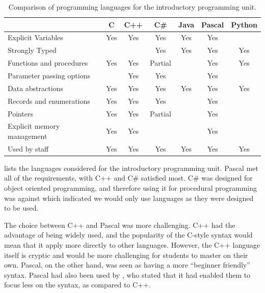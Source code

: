 \begin{table}
	\renewcommand{\arraystretch}{1.6}
	\centering
	\caption{Comparison of programming languages for the introductory programming unit.}
 	\label{tbl:language_comparison}

    \begin{tabular}{l|c|c|c|c|c|c}
    ~                                   & C   & C++ & C\#     & Java & Pascal & Python \\ \hline
    Explicit Variables                  & Yes & Yes & Yes     & Yes  & Yes    & ~      \\
    Strongly Typed                      & ~   & ~   & Yes     & Yes  & Yes    & Yes    \\
    Functions and procedures            & Yes & Yes & Partial & ~    & Yes    & Yes    \\
    Parameter passing options & ~   & Yes & Yes     & ~    & Yes    & ~     \\
    Data abstractions     & Yes & Yes & Yes     & Yes  & Yes    & Yes    \\
    Records and enumerations  & Yes & Yes & Yes     & ~    & Yes    & ~      \\
    Pointers                            & Yes & Yes & Partial & ~    & Yes    & ~      \\
    Explicit memory management & Yes & Yes & ~ & ~    & Yes    & ~      \\
    Used by staff     & Yes & Yes & Yes     & Yes  & Yes    & Yes    \\
    \end{tabular}
\end{table}

 lists the languages considered for the introductory programming unit. Pascal met all of the requirements, with C++ and C\# satisfied most. C\# was designed for object oriented programming, and therefore using it for procedural programming was against  which indicated we would only use languages as they were designed to be used. 

The choice between C++ and Pascal was more challenging. C++ had the advantage of being widely used, and the popularity of the C-style syntax would mean that it apply more directly to other languages. However, the C++ language itself is cryptic and would be more challenging for students to master on their own. Pascal, on the other hand, was seen as having a more ``beginner friendly'' syntax. Pascal had also been used by \citet{Becker:2002}, who stated that it had enabled them to focus less on the syntax, as compared to C++.

